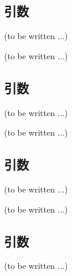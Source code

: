 \subsection{引数\TBW}
(to be written ...)



\clearpage
(to be written ...)


\subsection{引数\TBW}
(to be written ...)



\clearpage
(to be written ...)


\subsection{引数\TBW}
(to be written ...)



\clearpage
(to be written ...)


\subsection{引数\TBW}
(to be written ...)




